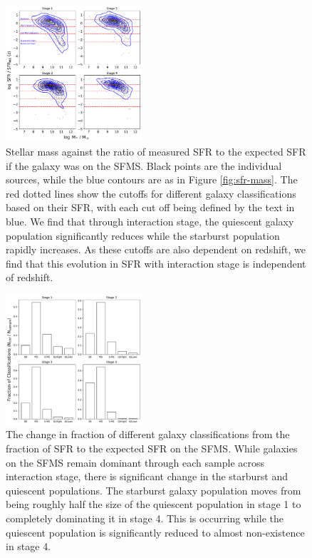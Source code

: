 \begin{figure}
    \centering
    \includegraphics[width=0.45\textwidth]{Chapter3/figures/sfr-clsf-dist.pdf}
    \caption{Stellar mass against the ratio of measured SFR to the expected SFR if the galaxy was on the SFMS. Black points are the individual sources, while the blue contours are as in Figure \ref{fig:sfr-mass}. The red dotted lines show the cutoffs for different galaxy classifications based on their SFR, with each cut off being defined by the text in blue. We find that through interaction stage, the quiescent galaxy population significantly reduces while the starburst population rapidly increases. As these cutoffs are also dependent on redshift, we find that this evolution in SFR with interaction stage is independent of redshift.}
    \label{fig:sfr-clsf}
\end{figure}

\begin{figure}
    \centering
    \includegraphics[width=0.45\textwidth]{Chapter3/figures/sfr-clsf-bar.pdf}
    \caption{The change in fraction of different galaxy classifications from the fraction of SFR to the expected SFR on the SFMS. While galaxies on the SFMS remain dominant through each sample across interaction stage, there is significant change in the starburst and quiescent populations. The starburst galaxy population moves from being roughly half the size of the quiescent population in stage 1 to completely dominating it in stage 4. This is occurring while the quiescent population is significantly reduced to almost non-existence in stage 4.}
    \label{fig:sfr-clsf-bar}
\end{figure}


